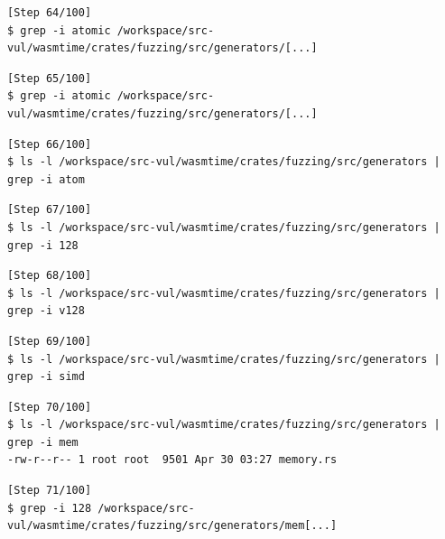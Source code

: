 \begin{tcolorbox}[enhanced,title={Example of \texttt{grep}/\texttt{ls}/\texttt{find} attempts}]
\begin{verbatim}
[Step 64/100]
$ grep -i atomic /workspace/src-vul/wasmtime/crates/fuzzing/src/generators/[...]

\end{verbatim}

\begin{verbatim}
[Step 65/100]
$ grep -i atomic /workspace/src-vul/wasmtime/crates/fuzzing/src/generators/[...]

\end{verbatim}

\begin{verbatim}
[Step 66/100]
$ ls -l /workspace/src-vul/wasmtime/crates/fuzzing/src/generators | grep -i atom

\end{verbatim}

\begin{verbatim}
[Step 67/100]
$ ls -l /workspace/src-vul/wasmtime/crates/fuzzing/src/generators | grep -i 128

\end{verbatim}

\begin{verbatim}
[Step 68/100]
$ ls -l /workspace/src-vul/wasmtime/crates/fuzzing/src/generators | grep -i v128

\end{verbatim}

\begin{verbatim}
[Step 69/100]
$ ls -l /workspace/src-vul/wasmtime/crates/fuzzing/src/generators | grep -i simd

\end{verbatim}

\begin{verbatim}
[Step 70/100]
$ ls -l /workspace/src-vul/wasmtime/crates/fuzzing/src/generators | grep -i mem
-rw-r--r-- 1 root root  9501 Apr 30 03:27 memory.rs
\end{verbatim}

\begin{verbatim}
[Step 71/100]
$ grep -i 128 /workspace/src-vul/wasmtime/crates/fuzzing/src/generators/mem[...]

\end{verbatim}


\end{tcolorbox}
